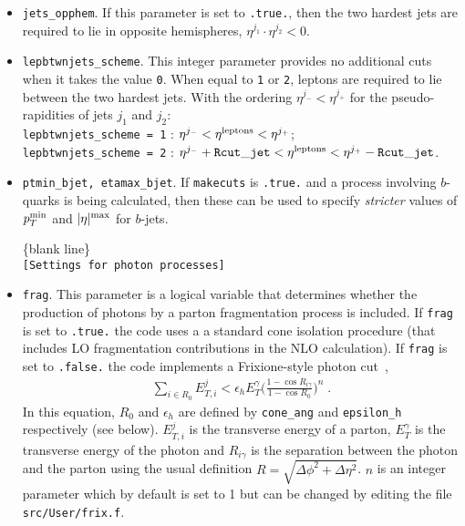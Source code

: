 \documentclass[12pt]{article}
\begin{document}
\begin{itemize}
\item {\tt jets\_opphem}. If this parameter is set to {\tt .true.},
then the two hardest jets are required to lie in opposite hemispheres,
$\eta^{j_1} \cdot \eta^{j_2} < 0$.

\item {\tt lepbtwnjets\_scheme}. This integer parameter provides no
additional cuts when it takes the value {\tt 0}. When equal to
{\tt 1} or {\tt 2}, leptons are required to lie between the two
hardest jets. With the ordering $\eta^{j_-} < \eta^{j_+}$ for the
pseudo-rapidities of jets $j_1$ and $j_2$: \\
{\tt lepbtwnjets\_scheme = 1} : 
 $\eta^{j_-} < \eta^{\rm leptons} < \eta^{j_+}$; \\
{\tt lepbtwnjets\_scheme = 2} :
 $\eta^{j_-}+{\tt Rcut\_jet} < \eta^{\rm leptons} < \eta^{j_+}-{\tt Rcut\_jet}$.

\item {\tt ptmin\_bjet,  etamax\_bjet}. If {\tt makecuts} is {\tt .true.}
and a process involving $b$-quarks is being calculated, then these can
be used to specify {\em stricter} values of $p_T^{\rm min}$
and $|\eta|^{\rm max}$ for $b$-jets.

\begin{center}
\{blank line\} \\
{\tt [Settings for photon processes] }
\end{center}
\item {\tt frag}. This parameter is a logical variable that determines whether the production of photons by a parton 
fragmentation process is included. If {\tt frag} is set to {\tt .true.} the code uses a a standard cone isolation
procedure (that includes LO fragmentation contributions in the NLO calculation).
If {\tt frag} is set to {\tt .false.} the code implements
a Frixione-style photon cut~\cite{Frixione:1998jh},
\begin{eqnarray}
\sum_{i \in R_0} E_{T,i}^j  < \epsilon_h E_{T}^{\gamma} \bigg(\frac{1-\cos{R_{i\gamma}}}{1-\cos{R_0}}\bigg)^{n} \;.
\label{frixeq}
\end{eqnarray}
In this equation, $R_0$ and $\epsilon_h$ are defined by {\tt cone\_ang} and {\tt epsilon\_h} respectively (see below).
$E_{T,i}^{j}$ is the transverse energy of a parton, $E_{T}^\gamma$ is the
transverse energy of the photon and $R_{i\gamma}$ is the separation between the photon and the parton using the usual definition 
$R=\sqrt{\Delta\phi^2+\Delta\eta^2}$. $n$ is an integer parameter which by default is set to 1 but can be changed by editing the 
file {\tt src/User/frix.f}. 


\end{itemize}
\end{document}
